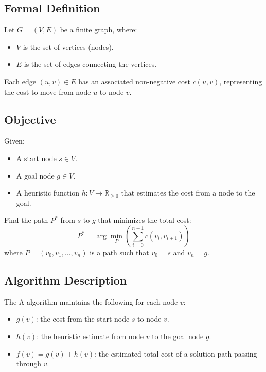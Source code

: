 \documentclass[12pt]{article}
\begin{document}
\subsection{Formal Definition}
Let \( G = (V, E) \) be a finite graph, where:

\begin{itemize}
    \item \( V \) is the set of vertices (nodes).
    \item \( E \) is the set of edges connecting the vertices.
\end{itemize}

\noindent Each edge \( (u, v) \in E \) has an associated non-negative cost \( c(u, v) \), representing the cost to move from node \( u \) to node \( v \).

\subsection{Objective}
Given:
\begin{itemize}
    \item A start node \( s \in V \).
    \item A goal node \( g \in V \).
    \item A heuristic function \( h: V \rightarrow \mathbb{R}_{\geq 0} \) that estimates the cost from a node to the goal.
\end{itemize}

\noindent Find the path \( P^* \) from \( s \) to \( g \) that minimizes the total cost:
\[
P^* = \arg\min_{P} \left( \sum_{i=0}^{n-1} c(v_i, v_{i+1}) \right)
\]
\noindent where \( P = (v_0, v_1, \dots, v_n) \) is a path such that \( v_0 = s \) and \( v_n = g \).

\subsection{Algorithm Description}
The A\* algorithm maintains the following for each node \( v \):
\begin{itemize}
    \item \( g(v) \): the cost from the start node \( s \) to node \( v \).
    \item \( h(v) \): the heuristic estimate from node \( v \) to the goal node \( g \).
    \item \( f(v) = g(v) + h(v) \): the estimated total cost of a solution path passing through \( v \).
\end{itemize}
\end{document}
